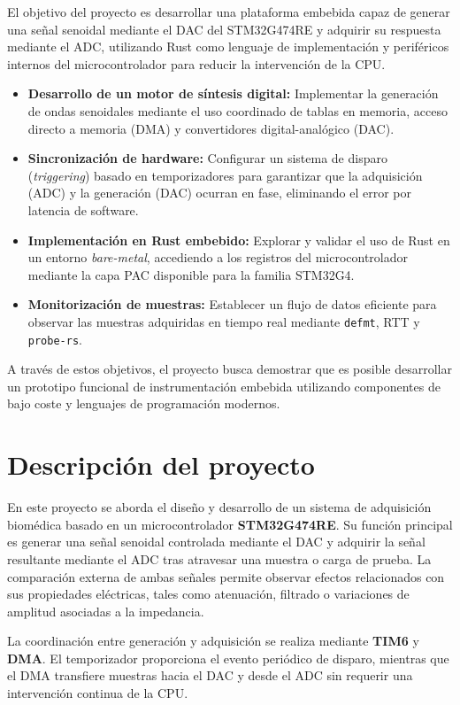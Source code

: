 \documentclass[11pt,a4paper]{article}
\begin{document}
El objetivo del proyecto es desarrollar una plataforma embebida capaz de generar una señal senoidal mediante el DAC del STM32G474RE y adquirir su respuesta mediante el ADC, utilizando Rust como lenguaje de implementación y periféricos internos del microcontrolador para reducir la intervención de la CPU.
\begin{itemize}
    \item \textbf{Desarrollo de un motor de síntesis digital:} Implementar la generación de ondas senoidales mediante el uso coordinado de tablas en memoria, acceso directo a memoria (DMA) y convertidores digital-analógico (DAC).
    \item \textbf{Sincronización de hardware:} Configurar un sistema de disparo (\textit{triggering}) basado en temporizadores para garantizar que la adquisición (ADC) y la generación (DAC) ocurran en fase, eliminando el error por latencia de software.
    \item \textbf{Implementación en Rust embebido:} Explorar y validar el uso de Rust en un entorno \textit{bare-metal}, accediendo a los registros del microcontrolador mediante la capa PAC disponible para la familia STM32G4.
    \item \textbf{Monitorización de muestras:} Establecer un flujo de datos eficiente para observar las muestras adquiridas en tiempo real mediante \texttt{defmt}, RTT y \texttt{probe-rs}.
\end{itemize}

A través de estos objetivos, el proyecto busca demostrar que es posible desarrollar un prototipo funcional de instrumentación embebida utilizando componentes de bajo coste y lenguajes de programación modernos.


\section{Descripción del proyecto}

En este proyecto se aborda el diseño y desarrollo de un sistema de adquisición biomédica basado en un microcontrolador \textbf{STM32G474RE}. Su función principal es generar una señal senoidal controlada mediante el DAC y adquirir la señal resultante mediante el ADC tras atravesar una muestra o carga de prueba. La comparación externa de ambas señales permite observar efectos relacionados con sus propiedades eléctricas, tales como atenuación, filtrado o variaciones de amplitud asociadas a la impedancia.

La coordinación entre generación y adquisición se realiza mediante \textbf{TIM6} y \textbf{DMA}. El temporizador proporciona el evento periódico de disparo, mientras que el DMA transfiere muestras hacia el DAC y desde el ADC sin requerir una intervención continua de la CPU.
\end{document}
